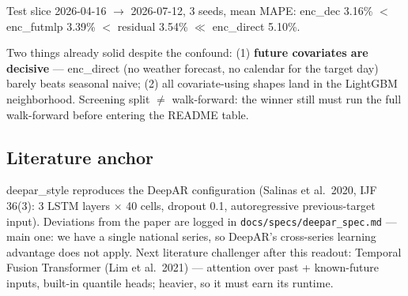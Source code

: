Test slice 2026-04-16 $\to$ 2026-07-12, 3 seeds, mean MAPE:
enc\_dec 3.16\% $<$ enc\_futmlp 3.39\% $<$ residual 3.54\%
$\ll$ enc\_direct 5.10\%.

Two things already solid despite the confound:
(1) \textbf{future covariates are decisive} --- enc\_direct (no weather
forecast, no calendar for the target day) barely beats seasonal naive;
(2) all covariate-using shapes land in the LightGBM neighborhood.
Screening split $\neq$ walk-forward: the winner still must run the full
walk-forward before entering the README table.

\subsection{Literature anchor}

deepar\_style reproduces the DeepAR configuration (Salinas et al.\ 2020,
IJF 36(3): 3 LSTM layers $\times$ 40 cells, dropout 0.1, autoregressive
previous-target input). Deviations from the paper are logged in
\texttt{docs/specs/deepar\_spec.md} --- main one: we have a single national
series, so DeepAR's cross-series learning advantage does not apply.
Next literature challenger after this readout: Temporal Fusion Transformer
(Lim et al.\ 2021) --- attention over past + known-future inputs, built-in
quantile heads; heavier, so it must earn its runtime.
